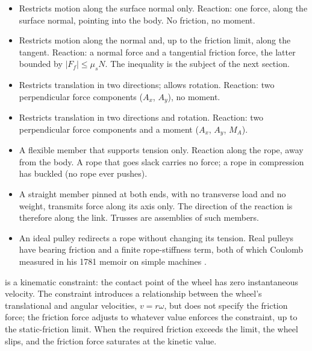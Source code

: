 \begin{itemize}[leftmargin=*]
  \item {} Restricts motion
    along the surface normal only. Reaction: one force, along the
    surface normal, pointing into the body. No friction, no moment.
  \item {} Restricts motion along the
    normal and, up to the friction limit, along the tangent.
    Reaction: a normal force and a tangential friction force, the
    latter bounded by $|F_f| \le \mu_s N$. The inequality is the
    subject of the next section.
  \item {} Restricts translation in two
    directions; allows rotation. Reaction: two perpendicular force
    components ($A_x$, $A_y$), no moment.
  \item {} Restricts translation in
    two directions and rotation. Reaction: two perpendicular force
    components and a moment ($A_x$, $A_y$, $M_A$).
  \item {} A flexible member that supports
    tension only. Reaction along the rope, away from the body. A rope
    that goes slack carries no force; a rope in compression has
    buckled (no rope ever pushes).
  \item {} A straight member
    pinned at both ends, with no transverse load and no weight,
    transmits force along its axis only. The direction of the
    reaction is therefore along the link. Trusses are assemblies of
    such members.
  \item {} An ideal pulley redirects a
    rope without changing its tension. Real pulleys have bearing
    friction and a finite rope-stiffness term, both of which Coulomb
    measured in his 1781 memoir on simple machines
    \cite{hist:coulomb1781}.
\end{itemize}



 is a kinematic constraint: the
contact point of the wheel has zero instantaneous velocity. The
constraint introduces a relationship between the wheel's translational
and angular velocities, $v = r\omega$, but does not specify the
friction force; the friction force adjusts to whatever value enforces
the constraint, up to the static-friction limit. When the required
friction exceeds the limit, the wheel slips, and the friction force
saturates at the kinetic value.

